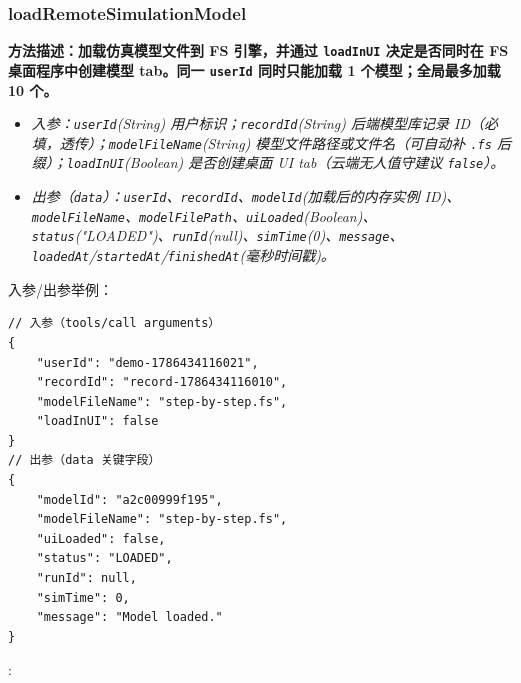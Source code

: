 \subsubsection{loadRemoteSimulationModel}
\bf{方法描述}：加载仿真模型文件到 FS 引擎，并通过 \texttt{loadInUI} 决定是否同时在 FS 桌面程序中创建模型 tab。同一 \texttt{userId} 同时只能加载 1 个模型；全局最多加载 10 个。
\begin{itemize}
	\item \it{入参}：\texttt{userId}(String) 用户标识；\texttt{recordId}(String) 后端模型库记录 ID（必填，透传）；\texttt{modelFileName}(String) 模型文件路径或文件名（可自动补 \texttt{.fs} 后缀）；\texttt{loadInUI}(Boolean) 是否创建桌面 UI tab（云端无人值守建议 \texttt{false}）。
	\item \it{出参}（\texttt{data}）：\texttt{userId}、\texttt{recordId}、\texttt{modelId}(加载后的内存实例 ID)、\texttt{modelFileName}、\texttt{modelFilePath}、\texttt{uiLoaded}(Boolean)、\texttt{status}("LOADED")、\texttt{runId}(null)、\texttt{simTime}(0)、\texttt{message}、\texttt{loadedAt}/\texttt{startedAt}/\texttt{finishedAt}(毫秒时间戳)。
\end{itemize}
入参/出参举例：
\begin{lstlisting}
// 入参（tools/call arguments）
{
    "userId": "demo-1786434116021",
    "recordId": "record-1786434116010",
    "modelFileName": "step-by-step.fs",
    "loadInUI": false
}
// 出参（data 关键字段）
{
    "modelId": "a2c00999f195",
    "modelFileName": "step-by-step.fs",
    "uiLoaded": false,
    "status": "LOADED",
    "runId": null,
    "simTime": 0,
    "message": "Model loaded."
}
\end{lstlisting}\vspace{-30pt}
:
